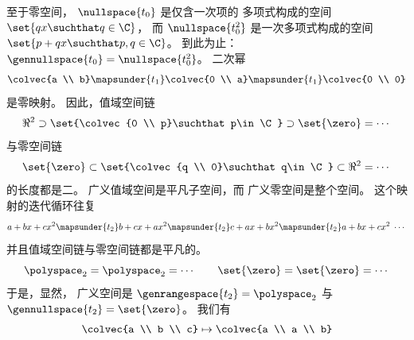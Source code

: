 \begin{exercises}
\begin{answer}
\begin{exparts}
           至于零空间，
           $\nullspace{t_0}$ 是仅含一次项的
           多项式构成的空间 $\set{qx\suchthat q\in \C}$，
           而
           $\nullspace{t_0^2}$ 是一次多项式构成的空间
           $\set{p+qx\suchthat p,q\in \C}$。
           到此为止：$\gennullspace{t_0}=\nullspace{t_0^2}$。
         \partsitem 二次幂
           \begin{equation*}
             \colvec{a \\ b}
              \mapsunder{t_1}\colvec{0 \\ a}
              \mapsunder{t_1}\colvec{0 \\ 0}
           \end{equation*}
           是零映射。
           因此，值域空间链
           \begin{equation*}
             \Re^2
               \supset\set{\colvec{0 \\ p}\suchthat p\in\C}
               \supset\set{\zero}
               =\cdots
           \end{equation*}
           与零空间链
           \begin{equation*}
             \set{\zero}
               \subset\set{\colvec{q \\ 0}\suchthat q\in\C}
               \subset\Re^2
               =\cdots
           \end{equation*}
           的长度都是二。
           广义值域空间是平凡子空间，而
           广义零空间是整个空间。
         \partsitem 这个映射的迭代循环往复
           \begin{equation*}
             a+bx+cx^2
               \mapsunder{t_2} b+cx+ax^2
               \mapsunder{t_2} c+ax+bx^2
               \mapsunder{t_2} a+bx+cx^2
               \;\cdots
           \end{equation*}
           并且值域空间链与零空间链都是平凡的。
           \begin{equation*}
             \polyspace_2=\polyspace_2=\cdots
              \qquad
              \set{\zero}=\set{\zero}=\cdots
           \end{equation*}
           于是，显然，
           广义空间是 $\genrangespace{t_2}=\polyspace_2$
           与 $\gennullspace{t_2}=\set{\zero}$。
         \partsitem 我们有
           \begin{equation*}
             \colvec{a \\ b \\ c}
                \mapsto\colvec{a \\ a \\ b}

\end{equation*}
\end{exparts}
\end{answer}
\end{exercises}
